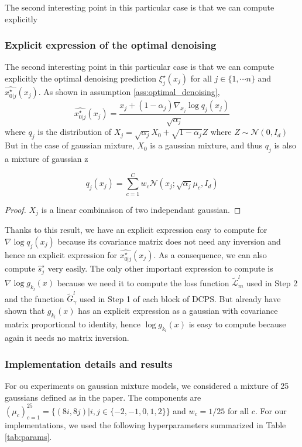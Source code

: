 \documentclass[12pt]{article}
\begin{document}
The second interesting point in this particular case is that we can compute explicitly


\subsubsection{Explicit expression of the optimal denoising }
The second interesting point in this particular case is that we can compute explicitly
the optimal denoising prediction $\xi_j^{\star}(x_j)$ for all $j \in \{1, \cdots n\}$ and
$\hat{x^\star_{0|j}}(x_j)$.
As shown in assumption \ref{ass:optimal_denoising}, 
$$\hat{x^\star_{0|j}}(x_j) = \frac{x_j + (1-\alpha_j) \nabla_{x_j}\log q_j(x_j)}{\sqrt{\alpha_j}}$$
where $q_j$ is the distribution of $X_j = \sqrt{\alpha_j} X_0 + \sqrt{1-\alpha_j} Z$ 
where $Z \sim \mathcal{N}(0,I_d)$
But in the case of  gaussian mixture, $X_0$ is a gaussian mixture, and thus
 $q_j$ is also a mixture of gaussian z

\begin{assumption}
    $$q_j(x_j) = \sum_{c=1}^C w_c  \mathcal{N}(x_j; \sqrt{\alpha_j}\mu_c, I_d)$$
\end{assumption}

\begin{proof}
$X_j$ is a linear combinaison of two independant gaussian.
\end{proof}

Thanks to this result, we have an explicit expression easy to compute 
for $\nabla \log q_j(x_j)$ because its covariance matrix does not need any inversion
and hence an explicit expression for $\hat{x^\star_{0|j}}(x_j)$.
As a consequence, we can also compute $\hat{s}^\star_j$ very easily.
The only other important expression to compute is $\nabla \log g_{k_l}(x)$ because we need 
it to compute the loss function $\tilde{\mathcal{L}}^l_m$ used in 
Step 2 and the function $\tilde{G}^l_\gamma$
used in Step 1 of each block of DCPS.
But already have shown that $g_{k_l}(x)$ has an explicit expression as a gaussian with covariance
matrix proportional to identity, hence $\log g_{k_l}(x)$ is easy to compute because again it needs 
no matrix inversion.
\subsubsection{Implementation details and results}
For ou experiments on gaussian mixture models, we considered a mixture of 25 gaussians defined
as in the paper.
The components are $(\mu_c)_{c=1}^{25} = \{(8i, 8j) | i,j \in \{-2,-1,0,1,2\}\}$ 
and $w_c = 1/25$ for all $c$.
For our implementations, we used the following hyperparameters summarized in Table \ref{tab:params}.
\end{document}
